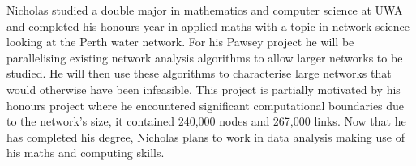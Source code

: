 Nicholas studied a double major in mathematics and computer science at UWA and completed his honours year in applied maths with a topic in network science looking at the Perth water network. For his Pawsey project he will be parallelising existing network analysis algorithms to allow larger networks to be studied. He will then use these algorithms to characterise large networks that would otherwise have been infeasible. This project is partially motivated by his honours project where he encountered significant computational boundaries due to the network's size, it contained 240,000 nodes and 267,000 links. Now that he has completed his degree, Nicholas plans to work in data analysis making use of his maths and computing skills.
